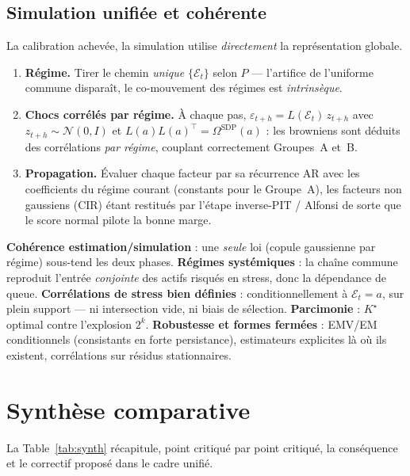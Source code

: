 \documentclass[11pt,a4paper]{article}
\theoremstyle{definition}
\newcommand{\Ecal}{\mathcal{E}}
\newcommand{\Ncal}{\mathcal{N}}
\newcommand{\eps}{\varepsilon}
\newcommand{\transp}{^{\!\top}}
\begin{document}
\subsection{Simulation unifiée et cohérente}

La calibration achevée, la simulation utilise \emph{directement} la représentation globale.

\begin{enumerate}
\item \textbf{Régime.} Tirer le chemin \emph{unique} $\{\Ecal_t\}$ selon $P$ --- l'artifice de l'uniforme commune disparaît, le co-mouvement des régimes est \emph{intrinsèque}.
\item \textbf{Chocs corrélés par régime.} À chaque pas, $\eps_{t+h}=L(\Ecal_t)\,z_{t+h}$ avec $z_{t+h}\sim\Ncal(0,I)$ et $L(a)L(a)\transp=\Omega^{\mathrm{SDP}}(a)$ : les browniens sont déduits des corrélations \emph{par régime}, couplant correctement Groupes~A et~B.
\item \textbf{Propagation.} Évaluer chaque facteur par sa récurrence AR avec les coefficients du régime courant (constants pour le Groupe~A), les facteurs non gaussiens (CIR) étant restitués par l'étape inverse-PIT / Alfonsi de sorte que le score normal pilote la bonne marge.
\end{enumerate}

\begin{mabox}
\textbf{Cohérence estimation/simulation} : une \emph{seule} loi (copule gaussienne par régime) sous-tend les deux phases. \textbf{Régimes systémiques} : la chaîne commune reproduit l'entrée \emph{conjointe} des actifs risqués en stress, donc la dépendance de queue. \textbf{Corrélations de stress bien définies} : conditionnellement à $\Ecal_t=a$, sur plein support --- ni intersection vide, ni biais de sélection. \textbf{Parcimonie} : $K^\star$ optimal contre l'explosion $2^k$. \textbf{Robustesse et formes fermées} : EMV/EM conditionnels (consistants en forte persistance), estimateurs explicites là où ils existent, corrélations sur résidus stationnaires.
\end{mabox}

\section{Synthèse comparative}

La Table~\ref{tab:synth} récapitule, point critiqué par point critiqué, la conséquence et le correctif proposé dans le cadre unifié.
\end{document}
